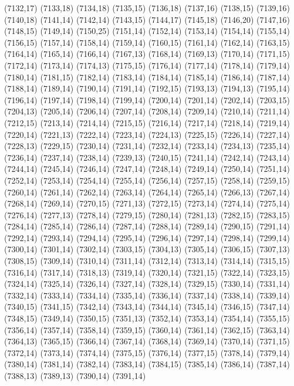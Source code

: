 (7132,17)
(7133,18)
(7134,18)
(7135,15)
(7136,18)
(7137,16)
(7138,15)
(7139,16)
(7140,18)
(7141,14)
(7142,14)
(7143,15)
(7144,17)
(7145,18)
(7146,20)
(7147,16)
(7148,15)
(7149,14)
(7150,25)
(7151,14)
(7152,14)
(7153,14)
(7154,14)
(7155,14)
(7156,15)
(7157,14)
(7158,14)
(7159,14)
(7160,15)
(7161,14)
(7162,14)
(7163,15)
(7164,14)
(7165,14)
(7166,14)
(7167,13)
(7168,14)
(7169,13)
(7170,14)
(7171,15)
(7172,14)
(7173,14)
(7174,13)
(7175,15)
(7176,14)
(7177,14)
(7178,14)
(7179,14)
(7180,14)
(7181,15)
(7182,14)
(7183,14)
(7184,14)
(7185,14)
(7186,14)
(7187,14)
(7188,14)
(7189,14)
(7190,14)
(7191,14)
(7192,15)
(7193,13)
(7194,13)
(7195,14)
(7196,14)
(7197,14)
(7198,14)
(7199,14)
(7200,14)
(7201,14)
(7202,14)
(7203,15)
(7204,13)
(7205,14)
(7206,14)
(7207,14)
(7208,14)
(7209,14)
(7210,14)
(7211,14)
(7212,15)
(7213,14)
(7214,14)
(7215,15)
(7216,14)
(7217,14)
(7218,14)
(7219,14)
(7220,14)
(7221,13)
(7222,14)
(7223,14)
(7224,13)
(7225,15)
(7226,14)
(7227,14)
(7228,13)
(7229,15)
(7230,14)
(7231,14)
(7232,14)
(7233,14)
(7234,13)
(7235,14)
(7236,14)
(7237,14)
(7238,14)
(7239,13)
(7240,15)
(7241,14)
(7242,14)
(7243,14)
(7244,14)
(7245,14)
(7246,14)
(7247,14)
(7248,14)
(7249,14)
(7250,14)
(7251,14)
(7252,14)
(7253,14)
(7254,14)
(7255,14)
(7256,14)
(7257,15)
(7258,14)
(7259,15)
(7260,14)
(7261,14)
(7262,14)
(7263,14)
(7264,14)
(7265,14)
(7266,13)
(7267,14)
(7268,14)
(7269,14)
(7270,15)
(7271,13)
(7272,15)
(7273,14)
(7274,14)
(7275,14)
(7276,14)
(7277,13)
(7278,14)
(7279,15)
(7280,14)
(7281,13)
(7282,15)
(7283,15)
(7284,14)
(7285,14)
(7286,14)
(7287,14)
(7288,14)
(7289,14)
(7290,15)
(7291,14)
(7292,14)
(7293,14)
(7294,14)
(7295,14)
(7296,14)
(7297,14)
(7298,14)
(7299,14)
(7300,14)
(7301,14)
(7302,14)
(7303,15)
(7304,13)
(7305,14)
(7306,15)
(7307,13)
(7308,15)
(7309,14)
(7310,14)
(7311,14)
(7312,14)
(7313,14)
(7314,14)
(7315,15)
(7316,14)
(7317,14)
(7318,13)
(7319,14)
(7320,14)
(7321,15)
(7322,14)
(7323,15)
(7324,14)
(7325,14)
(7326,14)
(7327,14)
(7328,14)
(7329,15)
(7330,14)
(7331,14)
(7332,14)
(7333,14)
(7334,14)
(7335,14)
(7336,14)
(7337,14)
(7338,14)
(7339,14)
(7340,15)
(7341,15)
(7342,14)
(7343,14)
(7344,14)
(7345,14)
(7346,15)
(7347,14)
(7348,15)
(7349,14)
(7350,15)
(7351,13)
(7352,14)
(7353,14)
(7354,14)
(7355,15)
(7356,14)
(7357,14)
(7358,14)
(7359,15)
(7360,14)
(7361,14)
(7362,15)
(7363,14)
(7364,13)
(7365,15)
(7366,14)
(7367,14)
(7368,14)
(7369,14)
(7370,14)
(7371,15)
(7372,14)
(7373,14)
(7374,14)
(7375,15)
(7376,14)
(7377,15)
(7378,14)
(7379,14)
(7380,14)
(7381,14)
(7382,14)
(7383,14)
(7384,15)
(7385,14)
(7386,14)
(7387,14)
(7388,13)
(7389,13)
(7390,14)
(7391,14)
